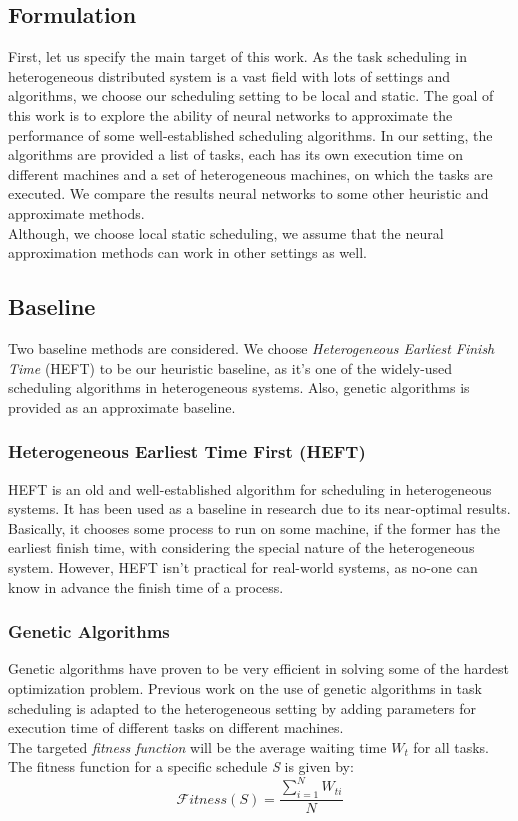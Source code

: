 \documentclass[twocolumn,11pt]{IEEEtran}
\begin{document}
\subsection{Formulation}
First, let us specify the main target of this work. As the task scheduling in heterogeneous distributed system is a vast field with lots of settings and algorithms\cite{inbook}, we choose our scheduling setting to be local and static. The goal of this work is to explore the ability of neural networks to approximate the performance of some well-established scheduling algorithms. In our setting, the algorithms are provided a list of tasks, each has its own execution time on different machines and a set of heterogeneous machines, on which the tasks are executed. We compare the results neural networks to some other heuristic and approximate methods. \\
Although, we choose local static scheduling, we assume that the neural approximation methods can work in other settings as well.

\subsection{Baseline}
Two baseline methods are considered. We choose \emph{Heterogeneous Earliest Finish Time} (HEFT)\cite{993206} to be our heuristic baseline, as it's one of the widely-used scheduling algorithms in heterogeneous systems. Also, genetic algorithms\cite{article2} is provided as an approximate baseline.

\subsubsection{Heterogeneous Earliest Time First (HEFT)}
HEFT\cite{993206} is an old and well-established algorithm for scheduling in heterogeneous systems. It has been used as a baseline in research due to its near-optimal results. Basically, it chooses some process to run on some machine, if the former has the earliest finish time, with considering the special nature of the heterogeneous system. However, HEFT isn't practical for real-world systems, as no-one can know in advance the finish time of a process.

\subsubsection{Genetic Algorithms}
Genetic algorithms\cite{article2} have proven to be very efficient in solving some of the hardest optimization problem. Previous work on the use of genetic algorithms in task scheduling \cite{article2} is adapted to the heterogeneous setting by adding parameters for execution time of different tasks on different machines. \\
The targeted \emph{fitness function} will be the average waiting time $W_t$ for all tasks. The fitness function for a specific schedule \emph{S} is given by:
\begin{equation}
\mathcal Fitness(S) = \frac{\sum_{i=1}^{N} W_{ti}}{N}
\end{equation}
\end{document}
